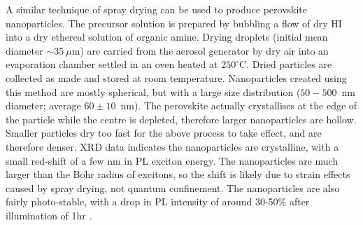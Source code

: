 A similar technique of spray drying can be used to produce perovskite nanoparticles. The precursor solution is prepared by bubbling a flow of dry HI into a dry ethereal solution of organic amine. Drying droplets (initial mean diameter $\sim 35~\mu$m) are carried from the aerosol generator by dry air into an evaporation chamber settled in an oven heated at $250^{\circ}$C. Dried particles are collected as made and stored at room temperature. Nanoparticles created using this method are mostly spherical, but with a large size distribution ($50-500$~nm diameter; average $60\pm10$~nm). The perovskite actually crystallises at the edge of the particle while the centre is depleted, therefore larger nanoparticles are hollow. Smaller particles dry too fast for the above process to take effect, and are therefore denser. XRD data indicates the nanoparticles are crystalline, with a small red-shift of a few nm in PL exciton energy. The nanoparticles are much larger than the Bohr radius of excitons, so the shift is likely due to strain effects caused by spray drying, not quantum confinement. The nanoparticles are also fairly photo-stable, with a drop in PL intensity of around 30-50\% after illumination of 1hr \cite{audebert2009}.

